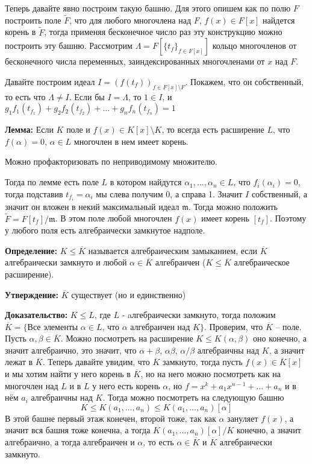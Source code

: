 \documentclass[a4paper, 12pt]{book}
\begin{document}
Теперь давайте явно построим такую башню. Для этого опишем как по полю $F$
построить поле $\widetilde F$, что для любого многочлена над $F$, $f(x)\in
F[x]$ найдется корень в $\widetilde F$, тогда применяя бесконечное число раз
эту конструкцию можно построить эту башню. Рассмотрим $\Lambda=F[\{t_f\}_{f\in F[x]}]$
кольцо многочленов от бесконечного числа переменных, заиндексированных
многочленами от $x$ над $F$.

Давайте построим идеал $I=(f(t_f))_{f\in F[x]\setminus F}$. Покажем, что он собственный, то
есть что $\Lambda\neq I$. Если бы $I=\Lambda$, то $1\in I$, и $g_1f_1(t_{f_1})+
g_2f_2(t_{f_2})+\ldots+g_nf_n(t_{f_n})=1$

\textbf{Лемма:} Если $K$ поле и $f(x)\in K[x]\setminus K$, то всегда есть расширение $L$,
что $f(\alpha)=0,\,\alpha\in L$ многочлен в нем имеет корень.

Можно профакторизовать по неприводимому множителю.

Тогда по лемме есть поле $L$ в котором найдутся $\alpha_1,\ldots,\alpha_n\in L$,
что $f_i(\alpha_i)=0$, тогда подставив $t_{f_i}=\alpha_i$ мы слева получим 0,
а справа 1. Значит $I$ собственный, а значит он вложен в некий максимальный
идеал $\mathfrak{m}$. Тогда можно положить $\widetilde{F}=F[t_f]/\mathfrak{m}$.
В этом поле любой многочлен $f(x)$ имеет корень $[t_f]$. Поэтому у любого поля
есть алгебраически замкнутое надполе.

\textbf{Определение:}  $K\le \overline K$ называется алгебраическим замыканием,
если $\overline K$ алгебраически замкнуто и любой $\alpha\in \overline K$
алгебраичен ($K\leq\overline K$ алгебраическое расширение).

\textbf{Утверждение:} $\overline K$ существует (но и единственно)

\textbf{Доказательство:} $K\le L$, где $L$ - aлгебраически замкнуто, тогда
положим $\overline K= \{\text{Все элементы $\alpha\in L$, что $\alpha$ алгебраичен
над $K$}\}$. Проверим, что $\overline K$ – поле. Пусть $\alpha,\beta\in\overline
K$. Можно посмотреть на расширение $K\le K(\alpha,\beta)$ оно конечно, а значит
алгебраично, это значит, что $\alpha+\beta$, $\alpha\beta$, $\alpha/\beta$
алгебраичны над $K$, а значит лежат в $\overline K$. Теперь давайте увидим, что
$\overline K$ замкнуто, тогда пусть $f(x)\in\overline K[x]$ и мы хотим найти у
него корень в $\overline K$, но на него можно посмотреть как на многочлен над
$L$ и в $L$ у него есть корень $\alpha$, но $f=x^k+a_1x^{n-1}+\ldots+a_n$ и
в нём $a_i$ алгебраичны над $K$. Тогда можно посмотреть на следующую башню
\[K\le K(a_1,\ldots,a_n)\le K(a_1,\ldots,a_n)[\alpha]\]
В этой башне первый этаж конечен, второй тоже, так как $\alpha$ зануляет $f(x)$,
а значит вся башня тоже конечна, а тогда $K(a_1,\ldots,a_n)[\alpha]/K$ конечно,
а значит алгебраично, а тогда алгебраичен и $\alpha$, то есть $\alpha\in
\overline K$ и $\overline K$ алгебраически замкнуто.
\end{document}
